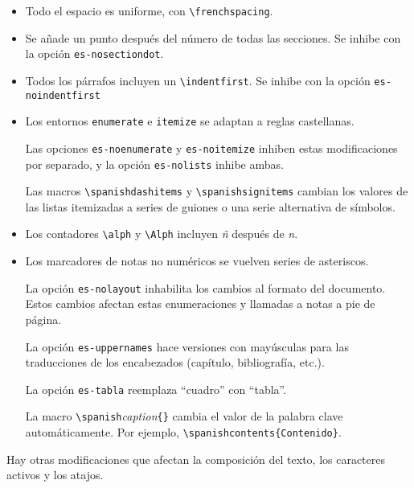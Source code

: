 \begin{itemize}
    \item Todo el espacio es uniforme, con \verb|\frenchspacing|.
    \item Se añade un punto después del número de todas las secciones. Se inhibe con la opción \verb|es-nosectiondot|.
    \item Todos los párrafos incluyen un \verb|\indentfirst|. Se inhibe con la opción \verb|es-noindentfirst|
    \item Los entornos \verb|enumerate| e \verb|itemize| se adaptan a reglas castellanas.

    Las opciones \verb|es-noenumerate| y \verb|es-noitemize| inhiben estas modificaciones por separado, y la opción \verb|es-nolists| inhibe ambas.

    Las macros \verb|\spanishdashitems| y \verb|\spanishsignitems| cambian los valores de las listas itemizadas a series de guiones o una serie alternativa de símbolos.

    \item Los contadores \verb|\alph| y \verb|\Alph| incluyen \textit{\~n} después de \textit{n}.
    \item Los marcadores de notas no numéricos se vuelven series de asteriscos.

    La opción \verb|es-nolayout| inhabilita los cambios al formato del documento.  Estos cambios afectan estas enumeraciones y llamadas a notas a pie de página.

    La opción \verb|es-uppernames| hace versiones con mayúsculas para las traducciones de los encabezados (capítulo, bibliografía, etc.).

    La opción \verb|es-tabla| reemplaza ``cuadro'' con ``tabla''.

    La macro \verb|\spanish|\textit{caption}\verb|{|\emph{}\verb|}| cambia el valor de la palabra clave automáticamente. Por ejemplo, \verb|\spanishcontents{Contenido}|.
\end{itemize}

Hay otras modificaciones que afectan la composición del texto, los caracteres
activos y los atajos.

